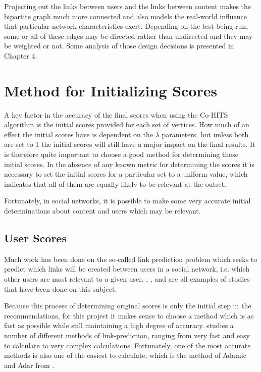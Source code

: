 Projecting out the links between users and the links between content makes the bipartite graph much more connected and also models the real-world influence that particular network characteristics exert. Depending on the test being run, some or all of these edges may be directed rather than undirected and they may be weighted or not. Some analysis of those design decisions is presented in Chapter 4.


\section{Method for Initializing Scores}
\label{sec:InitializationOfScores}

A key factor in the accuracy of the final scores when using the Co-HITS algorithm is the initial scores provided for each set of vertices. How much of an effect the initial scores have is dependent on the $\lambda$ parameters, but unless both are set to 1 the initial scores will still have a major impact on the final results. It is therefore quite important to choose a good method for determining those initial scores. In the absence of any known metric for determining the scores it is necessary to set the initial scores for a particular set to a uniform value, which indicates that all of them are equally likely to be relevant at the outset.

Fortunately, in social networks, it is possible to make some very accurate initial determinations about content and users which may be relevant.

\subsection{User Scores}
\label{sec:InitializationOfUserScores}

Much work has been done on the so-called link prediction problem which seeks to predict which links will be created between users in a social network, i.e. which other users are most relevant to a given user. \cite{LibenNowell2007}, \cite{Kunegis2010}, and \cite{Backstrom2010} are all examples of studies that have been done on this subject.

Because this process of determining original scores is only the initial step in the recommendations, for this project it makes sense to choose a method which is as fast as possible while still maintaining a high degree of accuracy. \cite{LibenNowell2007} studies a number of different methods of link-prediction, ranging from very fast and easy to calculate to very complex calculations. Fortunately, one of the most accurate methods is also one of the easiest to calculate, which is the method of Adamic and Adar from \cite{Adamic2003}.


